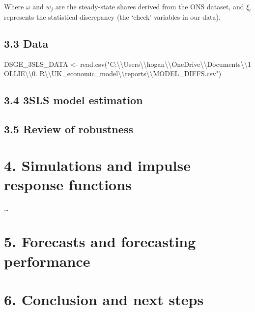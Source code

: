 \documentclass[
  letterpaper,
  DIV=11,
  numbers=noendperiod]{scrartcl}
\newenvironment{Shaded}{\begin{snugshade}}{\end{snugshade}}
\newcommand{\FunctionTok}[1]{\textcolor[rgb]{0.28,0.35,0.67}{#1}}
\newcommand{\NormalTok}[1]{\textcolor[rgb]{0.00,0.23,0.31}{#1}}
\newcommand{\OtherTok}[1]{\textcolor[rgb]{0.00,0.23,0.31}{#1}}
\newcommand{\SpecialCharTok}[1]{\textcolor[rgb]{0.37,0.37,0.37}{#1}}
\newcommand{\StringTok}[1]{\textcolor[rgb]{0.13,0.47,0.30}{#1}}
\begin{document}
Where \(\omega\) and \(w_j\) are the steady-state shares derived from
the ONS dataset, and \(\xi_t\) represents the statistical discrepancy
(the `check' variables in our data).

\subsection{3.3 Data}\label{data}

\begin{Shaded}
\begin{Highlighting}[]
\NormalTok{DSGE\_3SLS\_DATA }\OtherTok{\textless{}{-}} \FunctionTok{read.csv}\NormalTok{(}\StringTok{"C:}\SpecialCharTok{\textbackslash{}\textbackslash{}}\StringTok{Users}\SpecialCharTok{\textbackslash{}\textbackslash{}}\StringTok{hogan}\SpecialCharTok{\textbackslash{}\textbackslash{}}\StringTok{OneDrive}\SpecialCharTok{\textbackslash{}\textbackslash{}}\StringTok{Documents}\SpecialCharTok{\textbackslash{}\textbackslash{}}\StringTok{1 OLLIE}\SpecialCharTok{\textbackslash{}\textbackslash{}}\StringTok{0. R}\SpecialCharTok{\textbackslash{}\textbackslash{}}\StringTok{UK\_economic\_model}\SpecialCharTok{\textbackslash{}\textbackslash{}}\StringTok{reports}\SpecialCharTok{\textbackslash{}\textbackslash{}}\StringTok{MODEL\_DIFFS.csv"}\NormalTok{)}
\end{Highlighting}
\end{Shaded}

\subsection{3.4 3SLS model estimation}\label{sls-model-estimation}

\subsection{3.5 Review of robustness}\label{review-of-robustness}

\section{4. Simulations and impulse response
functions}\label{simulations-and-impulse-response-functions}

\ldots{}

\section{5. Forecasts and forecasting
performance}\label{forecasts-and-forecasting-performance}

\section{6. Conclusion and next steps}\label{conclusion-and-next-steps}
\end{document}
